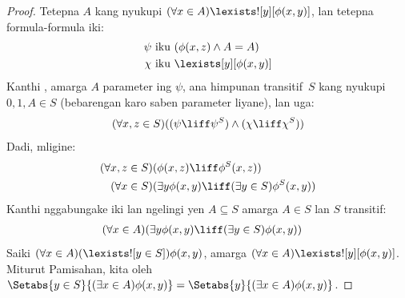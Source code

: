 \documentclass[../../../include/open-logic-section]{subfiles}
\begin{document}
\begin{proof}
Tetepna $A$ kang nyukupi
$(\forall x \in A)\lexists![y][\phi(x,y)]$,
lan tetepna formula-formula iki:
\begin{align*}
	\psi &\text{ iku } (\phi(x, z) \land A = A)\\
	\chi &\text{ iku } \lexists[y][\phi(x, y)]
\end{align*}
Kanthi , amarga $A$
parameter ing $\psi$, ana himpunan
transitif~$S$ kang nyukupi $0, 1, A \in S$
(bebarengan karo saben parameter liyane),
lan uga:
\[
	(\forall x,z \in S)((\psi \liff \psi^S) \land (\chi \liff \chi^S))
\]
Dadi, mligine:
\begin{align*}
	(\forall  x, z \in S)(&\phi(x, z) \liff \phi^S(x, z))\\
	(\forall x \in S)(&\exists y\phi(x, y) \liff (\exists y \in S)\phi^S(x, y)) 
\end{align*}
Kanthi nggabungake iki lan ngelingi yen
$A \subseteq S$ amarga $A \in S$ lan $S$
transitif:
\begin{align*}
	(\forall x \in A)(&\exists y\phi(x, y) \liff (\exists y \in S)\phi(x, y))
\end{align*}
Saiki $(\forall x \in A)(\lexists![y \in S])\phi(x, y)$,
amarga $(\forall x \in A)\lexists![y][\phi(x, y)]$.
Miturut Pamisahan, kita oleh
$\Setabs{y \in S}{(\exists x \in A) \phi(x, y)}
= \Setabs{y}{(\exists x \in A) \phi(x, y)}$.
\end{proof}
\end{document}
